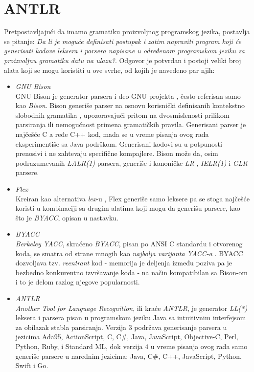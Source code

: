 \section{ANTLR}
\label{sec:ANTLR}

Pretpostavljajući da imamo gramatiku proizvoljnog programskog jezika, postavlja se pitanje: \emph{Da li je moguće definisati postupak i zatim napraviti program koji će generisati kodove leksera i parsera napisane u određenom programskom jeziku za proizvoljnu gramatiku datu na ulazu?}. Odgovor je potvrdan i postoji veliki broj alata koji se mogu koristiti u ove svrhe, od kojih je navedeno par njih: 
\begin{itemize}
    \item \emph{GNU Bison} \cite{GNUBison}\\
        GNU Bison je generator parsera i deo GNU projekta \cite{GNUProject}, često referisan samo kao \emph{Bison}. Bison generiše parser na osnovu korisnički definisanih kontekstno slobodnih gramatika \cite{ContextFreeGrammars}, upozoravajući pritom na dvosmislenosti prilikom parsiranja ili nemogućnost primena gramatičkih pravila. Generisani parser je najčešće C a ređe C++ kod, mada se u vreme pisanja ovog rada eksperimentiše sa Java podrškom. Generisani kodovi su u potpunosti prenosivi i ne zahtevaju specifične kompajlere. Bison može da, osim podrazumevanih \emph{LALR(1)} \cite{LALR1} parsera, generiše i kanoničke \emph{LR} \cite{LR}, \emph{IELR(1)} \cite{IELR1} i \emph{GLR} \cite{GLR} parsere.
    \item \emph{Flex} \cite{Flex}\\
        Kreiran kao alternativa \emph{lex}-u \cite{LexYacc}, Flex generiše samo leksere pa se stoga najčešće koristi u kombinaciji sa drugim alatima koji mogu da generišu parsere, kao što je \emph{BYACC}, opisan u nastavku.
    \item \emph{BYACC} \cite{BYACC}\\
        \emph{Berkeley YACC}, skraćeno \emph{BYACC}, pisan po ANSI C standardu i otvorenog koda, se smatra od strane mnogih kao \textit{najbolja varijanta YACC-a} \cite{LexYacc}. BYACC dozvoljava tzv. \emph{reentrant} kod - memorija je deljenja između poziva pa je bezbedno konkurentno izvršavanje koda - na način kompatibilan sa Bison-om i to je delom razlog njegove popularnosti.
    \item \emph{ANTLR} \cite{ANTLR}\\
        \emph{Another Tool for Language Recognition}, ili kraće \emph{ANTLR}, je generator \emph{LL(*)} \cite{LLStar} leksera i parsera pisan u programskom jeziku Java sa intuitivnim interfejsom za obilazak stabla parsiranja. Verzija $3$ podržava generisanje parsera u jezicima Ada95, ActionScript, C, C\#, Java, JavaScript, Objective-C, Perl, Python, Ruby, i Standard ML, dok verzija $4$ u vreme pisanja ovog rada samo generiše parsere u narednim jezicima: Java, C\#, C++, JavaScript, Python, Swift i Go.
\end{itemize}
